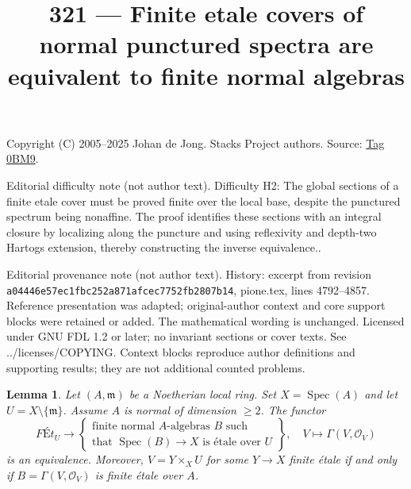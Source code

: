 \documentclass{amsart}
\theoremstyle{plain}
\newtheorem{lemma}[subsection]{Lemma}
\theoremstyle{definition}
\theoremstyle{remark}
\numberwithin{equation}{subsection}
\def\Spec{\mathop{\mathrm{Spec}}}
\begin{document}
\title[Stacks Project, Tag 0BM9]{321 --- Finite etale covers of normal punctured spectra are equivalent to finite normal algebras}
\maketitle
\noindent Copyright (C) 2005--2025 Johan de Jong. Stacks Project authors. Source: \href{https://stacks.math.columbia.edu/tag/0BM9}{Tag 0BM9}.

\noindent Editorial difficulty note (not author text). Difficulty H2: The global sections of a finite etale cover must be proved finite over the local base, despite the punctured spectrum being nonaffine. The proof identifies these sections with an integral closure by localizing along the puncture and using reflexivity and depth-two Hartogs extension, thereby constructing the inverse equivalence..

\noindent Editorial provenance note (not author text). History: excerpt from revision \texttt{a0444\allowbreak 6e57e\allowbreak c1fbc\allowbreak 252a8\allowbreak 71afc\allowbreak ec775\allowbreak 2fb28\allowbreak 07b14}, pione.tex, lines 4792--4857. Reference presentation was adapted; original-author context and core support blocks were retained or added. The mathematical wording is unchanged. Licensed under GNU FDL 1.2 or later; no invariant sections or cover texts. See ../licenses/COPYING. Context blocks reproduce author definitions and supporting results; they are not additional counted problems.

\begin{lemma}
\label{lemma-reformulate-purity-normal}
Let $(A, \mathfrak m)$ be a Noetherian local ring. Set $X = \Spec(A)$
and let $U = X \setminus \{\mathfrak m\}$. Assume $A$ is normal
of dimension $\geq 2$. The functor
$$
\textit{F\'Et}_U \longrightarrow
\left\{
\begin{matrix}
\text{finite normal }A\text{-algebras }B\text{ such} \\
\text{that }\Spec(B) \to X\text{ is \'etale over }U
\end{matrix}
\right\},
\quad
V \longmapsto \Gamma(V, \mathcal{O}_V)
$$
is an equivalence. Moreover, $V = Y \times_X U$ for some $Y \to X$
finite \'etale if and only if $B = \Gamma(V, \mathcal{O}_V)$
is finite \'etale over $A$.
\end{lemma}
\end{document}
